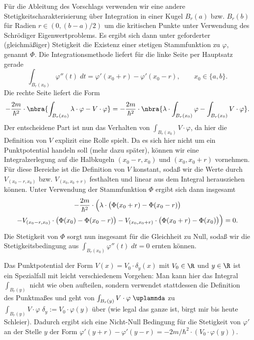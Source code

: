 \documentclass[../main.tex]{subfiles}
\begin{document}
            Für die Ableitung des Vorschlags verwenden wir eine andere Stetigkeitscharakterisierung über Integration in einer Kugel $B_{r}(a)$ bzw. $B_{r}(b)$ für Radien $r\in(0,(b-a)/2)$ um die kritischen Punkte unter Verwendung des Schrödiger Eigenwertproblems. Es ergibt sich dann unter geforderter (gleichmäßiger) Stetigkeit die Existenz einer stetigen Stammfunktion zu $\varphi$, genannt $\Phi$. Die Integrationsmethode liefert für die linke Seite per Hauptsatz gerade 
            \[
                \int_{B_r(x_0)}\varphi''(t)\;dt = \varphi'(x_0 + r) - \varphi'(x_0 - r),\qquad x_0\in\{a,b\}.
            \]
            Die rechte Seite liefert die Form
            \[
                -\frac{2m}{\hbar^2}\cdot\nbra{\int_{B_r(x_0)}\lambda\cdot\varphi - V\cdot\varphi} = -\frac{2m}{\hbar^2}\cdot\nbra{\lambda\cdot\int_{B_r(x_0)}\varphi - \int_{B_r(x_0)}V\cdot\varphi}.
            \]
            Der entscheidene Part ist nun das Verhalten von $\int_{B_r(x_0)}V\cdot \varphi$, da hier die Definition von $V$ explizit eine Rolle spielt. Da es sich hier nicht um ein Punktpotential handeln soll (mehr dazu später), können wir eine Integralzerlegung auf die Halbkugeln $(x_0-r,x_0)$ und $(x_0,x_0+r)$ vornehmen. Für diese Bereiche ist die Definition von $V$ konstant, sodaß wir die Werte durch $V_{(x_0-r,x_0)}$ bzw. $V_{(x_0,x_0+r)}$ festhalten und linear aus dem Integral herausziehen können. Unter Verwendung der Stammfunktion $\Phi$ ergibt sich dann insgesamt
            \begin{multline*}
                -\frac{2m}{\hbar^2}\cdot\Bigl(\lambda\cdot\bigl(\Phi(x_0 + r) - \Phi(x_0 - r)\bigr) \\
                - V_{(x_0-r,x_0)}\cdot\bigl(\Phi(x_0) - \Phi(x_0 - r)\bigr) - V_{(x_0,x_0+r)}\cdot\bigl(\Phi(x_0 + r) - \Phi(x_0)\bigr)\Bigr) = 0.
            \end{multline*}
            Die Stetigkeit von $\Phi$ sorgt nun insgesamt für die Gleichheit zu Null, sodaß wir die Stetigkeitsbedingung aus $\int_{B_r(x_0)}\varphi''(t)\;dt = 0$ ernten können. 

            Das Punktpotential der Form $V(x) = V_0\cdot\delta_{y}(x)$ mit $V_0\in\R$ und $y\in\R$ ist ein Spezialfall mit leicht verschiedenem Vorgehen: Man kann hier das Integral $\int_{B_r(y)}$ nicht wie oben aufteilen, sondern verwendet stattdessen die Definition des Punktmaßes und geht von $\int_{B_r(y)}V\cdot\varphi\;\uplamnda$ zu $\int_{B_r(y)}V\cdot\varphi\;\delta_y := V_0\cdot\varphi(y)$ über (wie legal das ganze ist, birgt mir bis heute Schleier). Dadurch ergibt sich eine Nicht-Null Bedingung für die Stetigkeit von $\varphi'$ an der Stelle $y$ der Form $\varphi'(y + r) - \varphi'(y - r) = -2m/\hbar^2\cdot (V_0\cdot\varphi(y))$.
\end{document}

